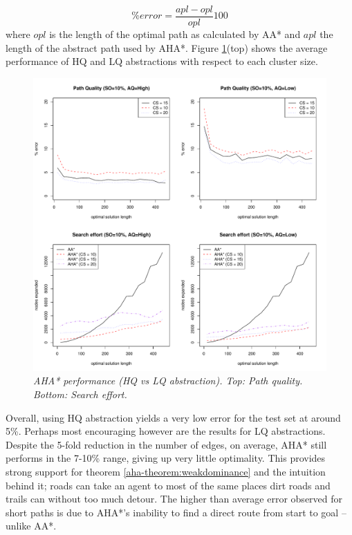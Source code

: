 $$ \%error = \frac{apl - opl}{opl}100 $$ where $opl$ is the length of the optimal path as calculated by AA* and $apl$ the length of the abstract path used by AHA*.
Figure \ref{aha-fig:allgraphs}(top) shows the average performance of HQ and LQ abstractions with respect to each cluster size. 
\begin{figure}[htbp]
       \caption{\small{\emph{AHA* performance (HQ vs LQ abstraction). Top: Path quality. Bottom: Search effort. }}}
       \begin{center}
                       \includegraphics[scale=0.35]{diagrams/allgraphs.pdf}
       \end{center}
       \label{aha-fig:allgraphs}
\end{figure}
Overall, using HQ abstraction yields a very low error for the test set at around 5\%. 
Perhaps most encouraging however are the results for LQ abstractions. 
Despite the 5-fold reduction in the number of edges, on average, AHA* still performs in the 7-10\% range, giving up very little optimality. 
This provides strong support for theorem \ref{aha-theorem:weakdominance} and the intuition behind it; roads can take an agent to most of the same places dirt roads and trails can without too much detour.
The higher than average error observed for short paths is due to AHA*'s inability to find a direct route from start to goal -- unlike AA*.

